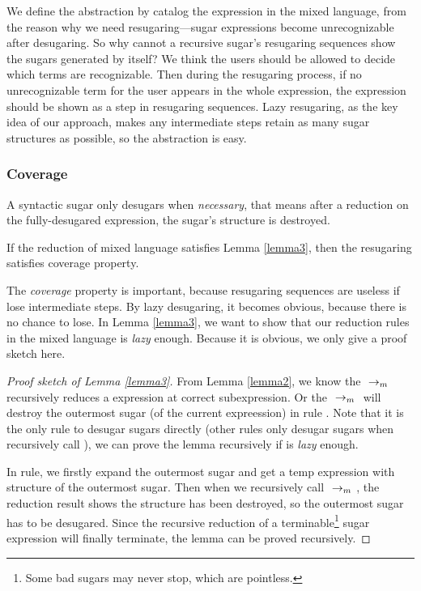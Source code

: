 We define the abstraction by catalog the expression in the mixed language, from the reason why we need resugaring---sugar expressions become unrecognizable after desugaring. So why cannot a recursive sugar's resugaring sequences show the sugars generated by itself? We think the users should be allowed to decide which terms are recognizable. Then during the resugaring process, if no unrecognizable term for the user appears in the whole expression, the expression should be shown as a step in resugaring sequences. Lazy resugaring, as the key idea of our approach, makes any intermediate steps retain as many sugar structures as possible, so the abstraction is easy.

\subsubsection{Coverage}
\begin{lemma}
\label{lemma3}
A syntactic sugar only desugars when \emph{necessary}, that means after a reduction on the fully-desugared expression, the sugar's structure is destroyed.
\end{lemma}

\begin{Def}[Coverage]
If the reduction of mixed language satisfies Lemma \ref{lemma3}, then the resugaring satisfies coverage property.
\end{Def}

The \emph{coverage} property is important, because resugaring sequences are useless if lose intermediate steps. By lazy desugaring, it becomes obvious, because there is no chance to lose. In Lemma \ref{lemma3}, we want to show that our reduction rules in the mixed language is \emph{lazy} enough. Because it is obvious, we only give a proof sketch here.

\begin{proof}[Proof sketch of Lemma \ref{lemma3}]
From Lemma \ref{lemma2}, we know the $~\rightarrow_m~$ recursively reduces a expression at correct subexpression. Or the $~\rightarrow_m~$ will destroy the outermost sugar (of the current expreession) in rule . Note that it is the only rule to desugar sugars directly (other rules only desugar sugars when recursively call ), we can prove the lemma recursively if  is \emph{lazy} enough.

In  rule, we firstly expand the outermost sugar and get a temp expression with structure of the outermost sugar. Then when we recursively call $~\rightarrow_m~$, the reduction result shows the structure has been destroyed, so the outermost sugar has to be desugared. Since the recursive reduction of a terminable\footnote{Some bad sugars may never stop, which are pointless.} sugar expression will finally terminate, the lemma can be proved recursively.
\end{proof}



